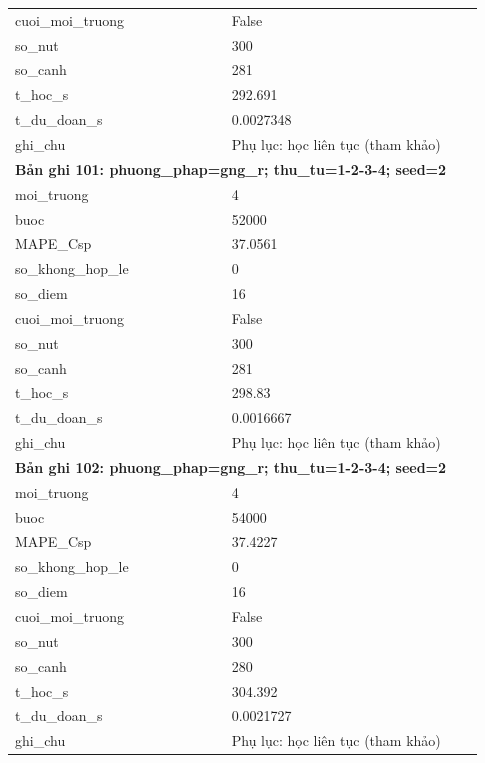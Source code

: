 \begin{longtable}{p{0.43\linewidth}p{0.50\linewidth}}
cuoi\_\allowbreak moi\_\allowbreak truong & False \\
so\_\allowbreak nut & 300 \\
so\_\allowbreak canh & 281 \\
t\_\allowbreak hoc\_\allowbreak s & 292.691 \\
t\_\allowbreak du\_\allowbreak doan\_\allowbreak s & 0.0027348 \\
ghi\_\allowbreak chu & Phụ lục: học liên tục (tham khảo) \\
\midrule
\multicolumn{2}{p{0.95\linewidth}}{\textbf{Bản ghi 101: phuong\_phap=gng\_r; thu\_tu=1-2-3-4; seed=2}} \\
moi\_\allowbreak truong & 4 \\
buoc & 52000 \\
MAPE\_\allowbreak Csp & 37.0561 \\
so\_\allowbreak khong\_\allowbreak hop\_\allowbreak le & 0 \\
so\_\allowbreak diem & 16 \\
cuoi\_\allowbreak moi\_\allowbreak truong & False \\
so\_\allowbreak nut & 300 \\
so\_\allowbreak canh & 281 \\
t\_\allowbreak hoc\_\allowbreak s & 298.83 \\
t\_\allowbreak du\_\allowbreak doan\_\allowbreak s & 0.0016667 \\
ghi\_\allowbreak chu & Phụ lục: học liên tục (tham khảo) \\
\midrule
\multicolumn{2}{p{0.95\linewidth}}{\textbf{Bản ghi 102: phuong\_phap=gng\_r; thu\_tu=1-2-3-4; seed=2}} \\
moi\_\allowbreak truong & 4 \\
buoc & 54000 \\
MAPE\_\allowbreak Csp & 37.4227 \\
so\_\allowbreak khong\_\allowbreak hop\_\allowbreak le & 0 \\
so\_\allowbreak diem & 16 \\
cuoi\_\allowbreak moi\_\allowbreak truong & False \\
so\_\allowbreak nut & 300 \\
so\_\allowbreak canh & 280 \\
t\_\allowbreak hoc\_\allowbreak s & 304.392 \\
t\_\allowbreak du\_\allowbreak doan\_\allowbreak s & 0.0021727 \\
ghi\_\allowbreak chu & Phụ lục: học liên tục (tham khảo) \\

\end{longtable}

